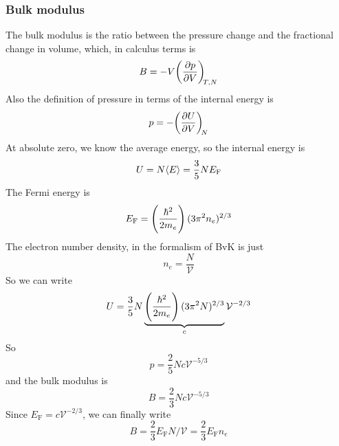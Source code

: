 \subsubsection{Bulk modulus}
The bulk modulus is the ratio between the pressure change and the fractional change in volume, which, in calculus terms is
\begin{equation}
	B=-V\diffp pV[T,N]
\end{equation}
Also the definition of pressure in terms of the internal energy is
\begin{equation}
	p=-\diffp UV[N]
\end{equation}
At absolute zero, we know the average energy, so the internal energy is
\begin{equation}
	U=N\langle E\rangle=\frac{3}{5}NE_{\mathrm{F}}
\end{equation}
The Fermi energy is
\begin{equation}
	E_{\mathrm{F}}=\left(\frac{\hbar^2}{2m_e} \right)(3\pi^2n_e)^{2/3}
\end{equation}
The electron number density, in the formalism of BvK is just 
\begin{equation}
	n_e=\frac{N}{\mathcal{V}}
\end{equation}
So we can write 
\begin{equation}
	U=\frac{3}{5}N\underbrace{\left(\frac{\hbar^2}{2m_e} \right)(3\pi^2N)^{2/3}}_{c}\mathcal{V}^{-2/3}
\end{equation}
So 
\begin{equation}
	p=\frac{2}{5}Nc\mathcal{V}^{-5/3}
\end{equation}
and the bulk modulus is
\begin{equation}
	B=\frac{2}{3}Nc\mathcal{V}^{-5/3}
\end{equation}
Since $E_{\mathrm{F}}=c\mathcal{V}^{-2/3}$, we can finally write
\begin{equation}
	B=\frac{2}{3}E_{\mathrm{F}}N/\mathcal{V}=\frac{2}{3}E_{\mathrm{F}}n_e
\end{equation}
